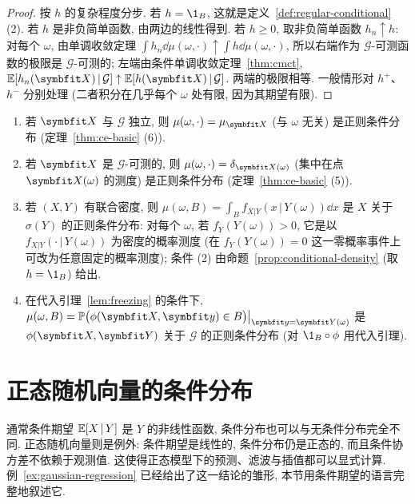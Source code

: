 \begin{proof}
按 $h$ 的复杂程度分步. 若 $h=\1_B$, 这就是定义~\ref{def:regular-conditional} (2). 若 $h$ 是非负简单函数, 由两边的线性得到. 若 $h\ge0$, 取非负简单函数 $h_n\uparrow h$: 对每个 $\omega$, 由单调收敛定理 $\int h_n\dd\mu(\omega,\cdot)\uparrow\int h\dd\mu(\omega,\cdot)$, 所以右端作为 $\mathcal{G}$-可测函数的极限是 $\mathcal{G}$-可测的; 左端由条件单调收敛定理~\ref{thm:cmct}, $\E[h_n(\rvec{X})\,|\,\mathcal{G}]\uparrow\E[h(\rvec{X})\,|\,\mathcal{G}]$. 两端的极限相等. 一般情形对 $h^+$、$h^-$ 分别处理 (二者积分在几乎每个 $\omega$ 处有限, 因为其期望有限).
\end{proof}

\begin{example}\label{ex:regular-examples}
\begin{enumerate}
\item 若 $\rvec{X}$ 与 $\mathcal{G}$ 独立, 则 $\mu(\omega,\cdot)=\mu_{\rvec{X}}$ (与 $\omega$ 无关) 是正则条件分布 (定理~\ref{thm:ce-basic} (6)).
\item 若 $\rvec{X}$ 是 $\mathcal{G}$-可测的, 则 $\mu(\omega,\cdot)=\delta_{\rvec{X}(\omega)}$ (集中在点 $\rvec{X}(\omega)$ 的测度) 是正则条件分布 (定理~\ref{thm:ce-basic} (5)).
\item 若 $(X,Y)$ 有联合密度, 则 $\mu(\omega,B)=\int_Bf_{X|Y}(x\,|\,Y(\omega))\dd x$ 是 $X$ 关于 $\sigma(Y)$ 的正则条件分布: 对每个 $\omega$, 若 $f_Y(Y(\omega))>0$, 它是以 $f_{X|Y}(\cdot\,|\,Y(\omega))$ 为密度的概率测度 (在 $f_Y(Y(\omega))=0$ 这一零概率事件上可改为任意固定的概率测度); 条件 (2) 由命题~\ref{prop:conditional-density} (取 $h=\1_B$) 给出.
\item 在代入引理~\ref{lem:freezing} 的条件下, $\mu(\omega,B)=\P\big(\phi(\rvec{X},\rvec{y})\in B\big)\big|_{\rvec{y}=\rvec{Y}(\omega)}$ 是 $\phi(\rvec{X},\rvec{Y})$ 关于 $\mathcal{G}$ 的正则条件分布 (对 $\1_B\circ\phi$ 用代入引理).
\end{enumerate}
\end{example}

\section{正态随机向量的条件分布}
\label{sec:2-4}

通常条件期望 $\mathbb{E}[X\,|\,Y]$ 是 $Y$ 的非线性函数, 条件分布也可以与无条件分布完全不同. 正态随机向量则是例外: 条件期望是线性的, 条件分布仍是正态的, 而且条件协方差不依赖于观测值. 这使得正态模型下的预测、滤波与插值都可以显式计算. 例~\ref{ex:gaussian-regression} 已经给出了这一结论的雏形, 本节用条件期望的语言完整地叙述它.

